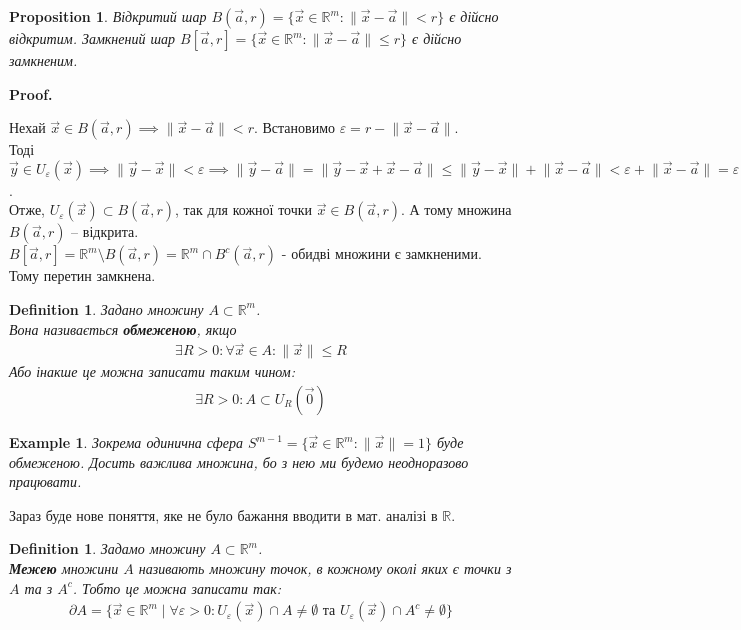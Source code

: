 \documentclass[a4paper, 10pt]{article}
\makeatletter
\def\qed{$\blacksquare$}
\theoremstyle{theoremdd}
\theoremstyle{theoremdd}
\theoremstyle{theoremdd}
\newtheorem{definition}[theorem]{Definition}
\theoremstyle{theoremdd}
\theoremstyle{theoremdd}
\newtheorem{example}[theorem]{Example}
\theoremstyle{theoremdd}
\newtheorem{proposition}[theorem]{Proposition}
\theoremstyle{theoremdd}
\theoremstyle{theoremdd}
\theoremstyle{theoremdd}
\renewenvironment{proof}[1][Proof.\\]{\par
\pushQED{\hfill \qed}%
\normalfont \topsep6\p@\@plus6\p@\relax
\trivlist
\item\relax
{\bfseries
#1\@addpunct{.}}\hspace\labelsep\ignorespaces
}{%
\popQED\endtrivlist\@endpefalse
}
\newcommand\Norm[1]{\|#1\|}
\makeatother
\begin{document}
\begin{proposition}
Відкритий шар $B(\vec{a},r) = \{ \vec{x} \in \mathbb{R}^m: \lVert \vec{x}-\vec{a} \rVert < r \}$ є дійсно відкритим. Замкнений шар $B[\vec{a},r] = \{ \vec{x} \in \mathbb{R}^m: \lVert \vec{x}-\vec{a} \rVert \leq r \}$ є дійсно замкненим.
\end{proposition}

\begin{proof}
Нехай $\vec{x} \in B(\vec{a},r) \implies \lVert \vec{x} - \vec{a} \rVert < r$. Встановимо $\varepsilon = r - \lVert \vec{x} - \vec{a} \rVert$.\\
Тоді $\vec{y} \in U_\varepsilon(\vec{x}) \implies \lVert \vec{y} - \vec{x} \rVert < \varepsilon \implies \lVert \vec{y} - \vec{a} \rVert = \lVert \vec{y} - \vec{x} + \vec{x} - \vec{a} \rVert \leq \lVert \vec{y} - \vec{x} \rVert + \lVert \vec{x} - \vec{a} \rVert < \varepsilon + \lVert \vec{x} - \vec{a} \rVert = \varepsilon \implies \vec{y} \in B(\vec{a},r)$. \\
Отже, $U_\varepsilon (\vec{x}) \subset B(\vec{a},r)$, так для кожної точки $\vec{x} \in B(\vec{a},r)$. А тому множина $B(\vec{a},r)$ -- відкрита.
\bigskip \\
$B[\vec{a}, r] = \mathbb{R}^m \setminus B(\vec{a}, r) = \mathbb{R}^m \cap B^c(\vec{a},r)$ - обидві множини є замкненими. Тому перетин замкнена.
\end{proof}

\begin{definition}
Задано множину $A \subset \mathbb{R}^m$.\\
Вона називається \textbf{обмеженою}, якщо
\begin{align*}
\exists R > 0: \forall \vec{x} \in A: \|\vec{x}\| \leq R
\end{align*}
Або інакше це можна записати таким чином:
\begin{align*}
\exists R > 0: A \subset U_R(\vec{0})
\end{align*}
\end{definition}

\begin{example}
Зокрема одинична сфера $S^{m-1} = \{ \vec{x} \in \mathbb{R}^m: \Norm{\vec{x}} =1 \}$ буде обмеженою. Досить важлива множина, бо з нею ми будемо неодноразово працювати.
\end{example}

Зараз буде нове поняття, яке не було бажання вводити в мат. аналізі в $\mathbb{R}$.
\begin{definition}
Задамо множину $A \subset \mathbb{R}^m$.\\
\textbf{Межею} множини $A$ називають множину точок, в кожному околі яких є точки з $A$ та з $A^c$. Тобто це можна записати так:
\begin{align*}
\partial A = \{ \vec{x} \in \mathbb{R}^m \mid \forall \varepsilon > 0: U_\varepsilon(\vec{x}) \cap A \neq \emptyset \text{ та } U_\varepsilon(\vec{x}) \cap A^c \neq \emptyset \}
\end{align*}
\end{definition}
\end{document}
